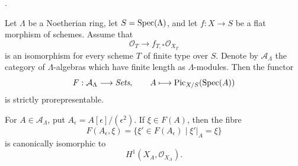 \begin{proposition}
\label{proposition-formal-picard-prorepresentable-tangent}
\begin{reference}
\cite[Expos\'e 195, C, Proposition 3.1, p. 384, and the correction on
p. 301]{FGA}.
\end{reference}
Let $\Lambda$ be a Noetherian ring, let $S = \mathop{\mathrm{Spec}}(\Lambda)$, and let
$f : X \to S$ be a flat morphism of schemes. Assume that
$$
\mathcal{O}_T \longrightarrow f_{T, *}\mathcal{O}_{X_T}
$$
is an isomorphism for every scheme $T$ of finite type over $S$. Denote by
$\mathcal{A}_\Lambda$ the category of $\Lambda$-algebras which have finite
length as $\Lambda$-modules. Then the functor
$$
F : \mathcal{A}_\Lambda \longrightarrow \textit{Sets}, \qquad
A \longmapsto \mathrm{Pic}_{X/S}(\mathop{\mathrm{Spec}}(A))
$$
is strictly prorepresentable.

For $A \in \mathcal{A}_\Lambda$, put
$A_\epsilon = A[\epsilon]/(\epsilon^2)$. If $\xi \in F(A)$, then the fibre
$$
F(A_\epsilon, \xi) =
\{\xi' \in F(A_\epsilon) \mid \xi'|_A = \xi\}
$$
is canonically isomorphic to
$$
H^1(X_A, \mathcal{O}_{X_A}).
$$
\end{proposition}


